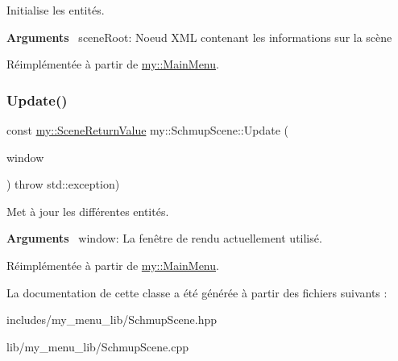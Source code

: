 Initialise les entités. 

{\bfseries Arguments}~\newline
 scene\+Root\+: Noeud X\+ML contenant les informations sur la scène 

Réimplémentée à partir de \hyperlink{classmy_1_1MainMenu_a56e81061a8d8d9a0da77267bd38ec058}{my\+::\+Main\+Menu}.

\mbox{\label{classmy_1_1SchmupScene_ad07d5b2302f0a4250150d51fdcfa1c0b}} 
\subsubsection{\texorpdfstring{Update()}{Update()}}
{\footnotesize\ttfamily const \hyperlink{structmy_1_1SceneReturnValue}{my\+::\+Scene\+Return\+Value} my\+::\+Schmup\+Scene\+::\+Update (\begin{DoxyParamCaption}\item[{sf\+::\+Render\+Window \&}]{window }\end{DoxyParamCaption}) throw  std\+::exception) \hspace{0.3cm}{\ttfamily [virtual]}}



Met à jour les différentes entités. 

{\bfseries Arguments}~\newline
 window\+: La fenêtre de rendu actuellement utilisé. 

Réimplémentée à partir de \hyperlink{classmy_1_1MainMenu_ada39ad2f51014f08e4526056967daf47}{my\+::\+Main\+Menu}.



La documentation de cette classe a été générée à partir des fichiers suivants \+:\begin{DoxyCompactItemize}
\item 
includes/my\+\_\+menu\+\_\+lib/Schmup\+Scene.\+hpp\item 
lib/my\+\_\+menu\+\_\+lib/Schmup\+Scene.\+cpp\end{DoxyCompactItemize}
